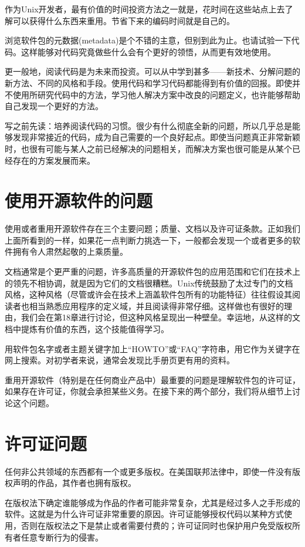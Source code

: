 \documentclass[12pt,oneside]{book}
\begin{document}
作为Unix开发者，最有价值的时间投资方法之一就是，花时间在这些站点上去了解可以获得什么东西来重用。节省下来的编码时间就是自己的。

浏览软件包的元数据(metadata)是个不错的主意，但别到此为止。也请试验一下代码。这样能够对代码究竟做些什么会有个更好的领悟，从而更有效地使用。

更一般地，阅读代码是为未来而投资。可以从中学到甚多——新技术、分解问题的新方法、不同的风格和手段。使用代码和学习代码都能得到有价值的回报。即使并不使用所研究代码中的方法，学习他人解决方案中改良的问题定义，也许能够帮助自己发现一个更好的方法。

写之前先读：培养阅读代码的习惯。很少有什么彻底全新的问题，所以几乎总是能够发现非常接近的代码，成为自己需要的一个良好起点。即使当问题真正非常新颖时，也很有可能与某人之前已经解决的问题相关，而解决方案也很可能是从某个已经存在的方案发展而来。

\section{使用开源软件的问题}
使用或者重用开源软件存在三个主要问题；质量、文档以及许可证条款。正如我们上面所看到的一样，如果花一点判断力挑选一下，一般都会发现一个或者更多的软件拥有令人肃然起敬的上乘质量。

文档通常是个更严重的问题，许多高质量的开源软件包的应用范围和它们在技术上的领先不相协调，就是因为它们的文档很糟糕。Unix传统鼓励了太过专门的文档风格，这种风格（尽管或许会在技术上涵盖软件包所有的功能特征）往往假设其阅读者也相当熟悉应用程序的定义域，并且阅读得非常仔细。这样做也有很好的理由，我们会在第18章进行讨论，但这种风格呈现出一种壁垒。幸运地，从这样的文档中提炼有价值的东西，这个技能值得学习。

用软件包名字或者主题关键字加上“HOWTO”或“FAQ”字符串，用它作为关键字在网上搜索。对初学者来说，通常会发现比手册页更有用的资料。

重用开源软件（特别是在任何商业产品中）最重要的问题是理解软件包的许可证，如果存在许可证，你就会承担某些义务。在接下来的两个部分，我们将从细节上讨论这个问题。


\section{许可证问题}
任何非公共领域的东西都有一个或更多版权。在美国联邦法律中，即使一件没有版权声明的作品，其作者也拥有版权。

在版权法下确定谁能够成为作品的作者可能非常复杂，尤其是经过多人之手形成的软件。这就是为什么许可证非常重要的原因。许可证能够授权代码以某种方式使用，否则在版权法之下是禁止或者需要付费的；许可证同时也保护用户免受版权所有者任意专断行为的侵害。
\end{document}
